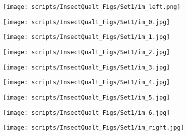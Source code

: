 \documentclass[10pt,twocolumn,letterpaper]{article}
\begin{document}
\begin{table*}[!t]
\begin{figure*}[t]
    \begin{center}
    \begin{subfigure}[b]{0.1\textwidth}
        \centering
        \texttt{[image: scripts/InsectQualt\_Figs/Set1/im\_left.png]}
    \end{subfigure}
    \hfill
    \begin{subfigure}[b]{0.1\textwidth}
        \centering
        \texttt{[image: scripts/InsectQualt\_Figs/Set1/im\_0.jpg]}
    \end{subfigure}
    \hfill
    \begin{subfigure}[b]{0.1\textwidth}
        \centering
        \texttt{[image: scripts/InsectQualt\_Figs/Set1/im\_1.jpg]}
    \end{subfigure}
    \hfill
    \begin{subfigure}[b]{0.1\textwidth}
        \centering
        \texttt{[image: scripts/InsectQualt\_Figs/Set1/im\_2.jpg]}
    \end{subfigure}
    \hfill
    \begin{subfigure}[b]{0.1\textwidth}
        \centering
        \texttt{[image: scripts/InsectQualt\_Figs/Set1/im\_3.jpg]}
    \end{subfigure}
    \hfill
    \begin{subfigure}[b]{0.1\textwidth}
        \centering
        \texttt{[image: scripts/InsectQualt\_Figs/Set1/im\_4.jpg]}
    \end{subfigure}
    \hfill
    \begin{subfigure}[b]{0.1\textwidth}
        \centering
        \texttt{[image: scripts/InsectQualt\_Figs/Set1/im\_5.jpg]}
    \end{subfigure}
    \hfill
    \begin{subfigure}[b]{0.1\textwidth}
        \centering
        \texttt{[image: scripts/InsectQualt\_Figs/Set1/im\_6.jpg]}
    \end{subfigure}
    \hfill
    \begin{subfigure}[b]{0.1\textwidth}
        \centering
        \texttt{[image: scripts/InsectQualt\_Figs/Set1/im\_right.jpg]}
    \end{subfigure}
    



\end{center}
\end{figure*}
\end{table*}
\end{document}
